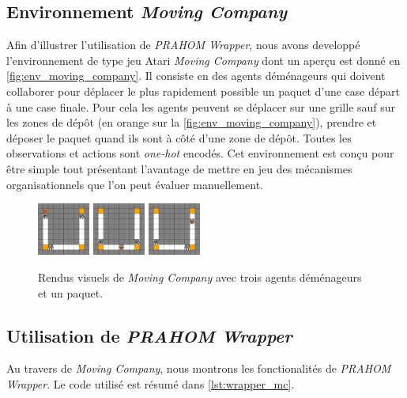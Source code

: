 \documentclass[demonstration]{jfsma}
\begin{document}
\subsection{Environnement \emph{Moving Company}}

Afin d'illustrer l'utilisation de \emph{PRAHOM Wrapper}, nous avons developpé l'environnement de type jeu Atari \emph{Moving Company} dont un aperçu est donné en \autoref{fig:env_moving_company}. Il consiste en des agents déménageurs qui doivent collaborer pour déplacer le plus rapidement possible un paquet d'une case départ à une case finale. Pour cela les agents peuvent se déplacer sur une grille sauf sur les zones de dépôt (en orange sur la \autoref{fig:env_moving_company}), prendre et déposer le paquet quand ils sont à côté d'une zone de dépôt. Toutes les observations et actions sont \emph{one-hot} encodés. Cet environnement est conçu pour être simple tout présentant l'avantage de mettre en jeu des mécanismes organisationnels que l'on peut évaluer manuellement.

\begin{figure}[h!]
  \centering
  \includegraphics[width=0.154\textwidth]{figures/moving_company_1.png}
  \includegraphics[width=0.154\textwidth]{figures/moving_company_2.png}
  \includegraphics[width=0.154\textwidth]{figures/moving_company_3.png}
  \caption{Rendus visuels de \emph{Moving Company} avec trois agents déménageurs et un paquet.}
  \label{fig:env_moving_company}
\end{figure}

\subsection{Utilisation de \emph{PRAHOM Wrapper}}

Au travers de \emph{Moving Company}, nous montrons les fonctionalités de \emph{PRAHOM Wrapper}. Le code utilisé est résumé dans \autoref{lst:wrapper_mc}.
\end{document}
